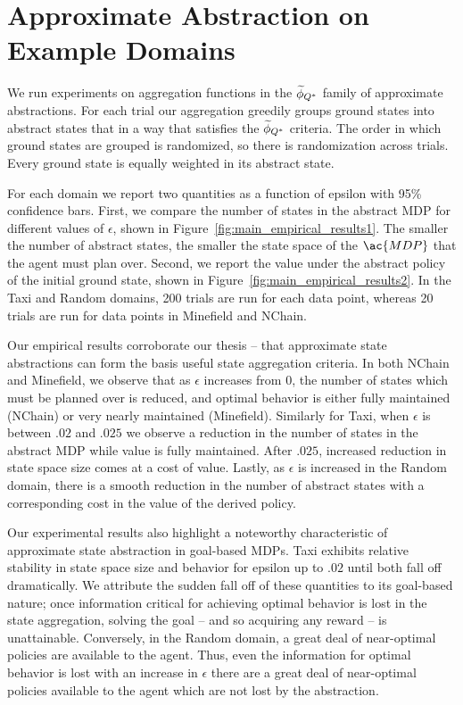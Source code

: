 \section{Approximate Abstraction on Example Domains}
We run experiments on aggregation functions in the $\widetilde \phi_{Q^*}$ family of approximate abstractions. For each trial our aggregation greedily groups ground states into abstract states that in a way that satisfies the $\widetilde \phi_{Q^*}$ criteria. The order in which ground states are grouped is randomized, so there is randomization across trials. Every ground state is equally weighted in its abstract state.

For each domain we report two quantities as a function of epsilon with 95\% confidence bars. First, we compare the number of states in the abstract \ac{MDP} for different values of $\epsilon$, shown in Figure~\ref{fig:main_empirical_results1}. The smaller the number of abstract states, the smaller the state space of the $\ac{MDP}$ that the agent must plan over. Second, we report the value under the abstract policy of the initial ground state, shown in Figure~\ref{fig:main_empirical_results2}. In the Taxi and Random domains, 200 trials are run for each data point, whereas 20 trials are run for data points in Minefield and NChain.

Our empirical results corroborate our thesis -- that approximate state abstractions can form the basis useful state aggregation criteria. In both NChain and Minefield, we observe that as $\epsilon$ increases from $0$, the number of states which must be planned over is reduced, and optimal behavior is either fully maintained (NChain) or very nearly maintained (Minefield). Similarly for Taxi, when $\epsilon$ is between $.02$ and $.025$ we observe a reduction in the number of states in the abstract \ac{MDP} while value is fully maintained. After $.025$, increased reduction in state space size comes at a cost of value. Lastly, as $\epsilon$ is increased in the Random domain, there is a smooth reduction in the number of abstract states with a corresponding cost in the value of the derived policy.

Our experimental results also highlight a noteworthy characteristic of approximate state abstraction in goal-based \acp{MDP}. Taxi exhibits relative stability in state space size and behavior for epsilon up to $.02$ until both fall off dramatically. We attribute the sudden fall off of these quantities to its goal-based nature; once information critical for achieving optimal behavior is lost in the state aggregation, solving the goal -- and so acquiring any reward -- is unattainable. Conversely, in the Random domain, a great deal of near-optimal policies are available to the agent. Thus, even the information for optimal behavior is lost with an increase in $\epsilon$ there are a great deal of near-optimal policies available to the agent which are not lost by the abstraction.

